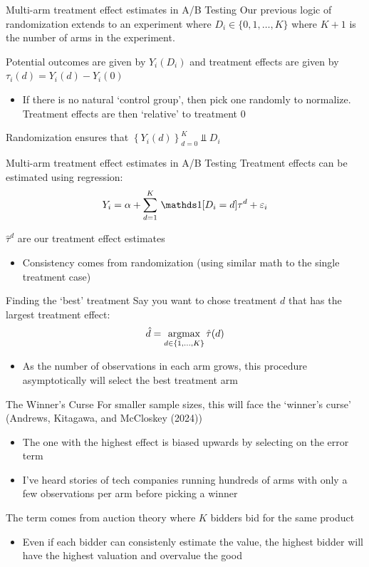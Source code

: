 \documentclass[aspectratio=169,t,11pt,table]{beamer}
\begin{document}
\begin{frame}{Multi-arm treatment effect estimates in A/B Testing}
  Our previous logic of randomization extends to an experiment where $D_i \in \{0, 1, \dots, K \}$ where $K + 1$ is the number of arms in the experiment.

	\bigskip
	Potential outcomes are given by $Y_i(D_i)$ and treatment effects are given by $\tau_i(d) = Y_{i}(d) - Y_{i}(0)$
	\pause
	\begin{itemize}
		\item If there is no natural `control group', then pick one randomly to normalize. Treatment effects are then `relative' to treatment 0
	\end{itemize}

	\bigskip
	Randomization ensures that $\left\{ Y_i(d) \right\}_{d=0}^K \Perp D_i$
\end{frame}

\begin{frame}{Multi-arm treatment effect estimates in A/B Testing}
	Treatment effects can be estimated using regression:
	$$
		Y_i = \alpha + \sum_{d = 1}^K \one{D_i = d} \tau^d + \varepsilon_i
	$$

	$\hat{\tau}^d$ are our treatment effect estimates
	\begin{itemize}
		\item Consistency comes from randomization (using similar math to the single treatment case)
	\end{itemize}
\end{frame}

\begin{frame}{Finding the `best' treatment}
	Say you want to chose treatment $d$ that has the largest treatment effect:
	$$
		\hat{d} = \operatorname*{argmax}_{d \in \{1, \dots, K\}} \hat{\tau}(d)
	$$
	\begin{itemize}
		\item As the number of observations in each arm grows, this procedure asymptotically will select the best treatment arm
	\end{itemize}
\end{frame}

\begin{frame}{The Winner's Curse}
	For smaller sample sizes, this will face the `winner's curse' (Andrews, Kitagawa, and McCloskey (2024))
	\begin{itemize}
		\item The one with the highest effect is biased upwards by selecting on the error term
		\pause
		\item I've heard stories of tech companies running hundreds of arms with only a few observations per arm before picking a winner
	\end{itemize}

	\pause
	\bigskip
	The term comes from auction theory where $K$ bidders bid for the same product
	\begin{itemize}
		\item Even if each bidder can consistenly estimate the value, the highest bidder will have the highest valuation and overvalue the good
	\end{itemize}
\end{frame}
\end{document}
